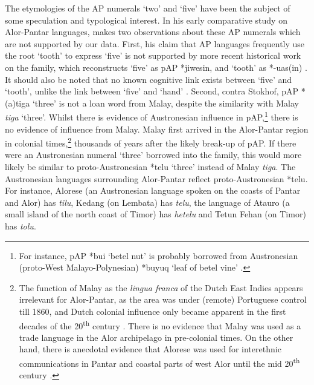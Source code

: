 The etymologies of the AP numerals `two' and `five' have been the subject of some speculation and typological interest. In his early comparative study on Alor-Pantar languages, \citet[21]{Stokhof1975} makes two observations about these AP numerals which are not supported by our data. First, his claim that AP languages frequently use the root `tooth' to express `five' is not supported by more recent historical work on the family, which reconstructs `five' as pAP *jiwesin, and `tooth' as *-uas(in) \citep{HoltonRobinsonTVhistory}. It should also be noted that no known cognitive link exists between `five' and `tooth', unlike the link between `five' and `hand' \citep{Majewicz1981,Majewicz1984,Heine1997}. Second, contra Stokhof, pAP *(a)tiga `three' is not a loan word from Malay, despite the similarity with Malay \textit{tiga} `three'. Whilst there is evidence of Austronesian influence in pAP,\footnote{For instance, pAP *bui `betel nut' is probably borrowed from Austronesian (proto-West Malayo-Polynesian) *buyuq `leaf of betel vine' \citep{Blustnd}.}   there is no evidence of influence from Malay. Malay first arrived in the Alor-Pantar region in colonial times,\footnote{The function of Malay as the \textit{lingua franca} of the Dutch East Indies appears irrelevant for Alor-Pantar, as the area was under (remote) Portuguese control till 1860, and Dutch colonial influence only became apparent in the first decades of the 20\textsuperscript{th} century \citep[14 and references cited there]{Klamer2010grammar}. There is no evidence that Malay was used as a trade language in the Alor archipelago in pre-colonial times. On the other hand, there is anecdotal evidence that Alorese was used for interethnic communications in Pantar and coastal parts of west Alor until the mid 20\textsuperscript{th} century \citep{Klamer2011}.}  thousands of years after the likely break-up of pAP. If there were an Austronesian numeral `three' borrowed into the family, this would more likely be similar to proto-Austronesian  *telu `three' \citep[268]{Blust2009} instead of Malay \textit{tiga}. The Austronesian languages surrounding Alor-Pantar reflect proto-Austronesian *telu. For instance, Alorese (an Austronesian language spoken on the coasts of Pantar and Alor) has \textit{tilu}, Kedang (on Lembata) has \textit{telu}, the language of Atauro (a small island of the north coast of Timor) has \textit{hetelu} and Tetun Fehan (on Timor) has \textit{tolu}.

